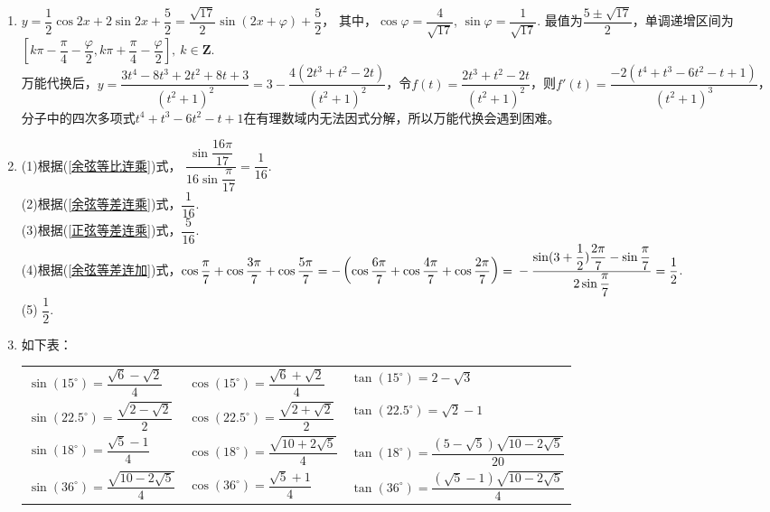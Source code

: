 \begin{enumerate}[label={\textbf{\arabic*.}},leftmargin=
    \inteval{\myenumleftmargin}pt]
\item
$ y=\dfrac{1}{2}\cos 2x+2\sin2x+\dfrac{5}{2}=
\dfrac{\sqrt{17}}{2}\sin(2x+\varphi)+\dfrac{5}{2} $，
其中，$ \cos\varphi=\dfrac{4}{\sqrt{17}} $, $ \sin\varphi=\dfrac{1}{\sqrt{17}} $. 
最值为$ \dfrac{5\pm \sqrt{17}}{2} $，单调递增区间为$ [k\pi-\dfrac{\pi}{4}-\dfrac{\varphi}{2},k\pi+\dfrac{\pi}{4}-\dfrac{\varphi}{2}],\ k\in \textbf{Z} $. \\
万能代换后，$ y=\dfrac{3t^4-8t^3+2t^2+8t+3}{(t^2+1)^2}=3-\dfrac{4(2t^3+t^2-2t)}
{(t^2+1)^2} $，令$ f(t)=\dfrac{2t^3+t^2-2t}{(t^2+1)^2} $，则$ f'(t)=
\dfrac{-2(t^4+t^3-6t^2-t+1)}{(t^2+1)^3} $，分子中的四次多项式$ t^4+t^3-6t^2-t+1 $在有理数域内无法因式分解，所以万能代换会遇到困难。

\item
(1)根据(\ref{余弦等比连乘})式，
$ \dfrac{\sin\dfrac{16\pi}{17}}{16\sin\dfrac{\pi}{17}}=\dfrac{1}{16} $. \\
(2)根据(\ref{余弦等差连乘})式，$ \dfrac{1}{16} $. \\
(3)根据(\ref{正弦等差连乘})式，$ \dfrac{5}{16} $. \\
(4)根据(\ref{余弦等差连加})式，$ \cos\dfrac{\pi}{7}+\cos\dfrac{3\pi}{7}+\cos\dfrac{5\pi}{7}=
-\left(\cos\dfrac{6\pi}{7}+\cos\dfrac{4\pi}{7}+\cos\dfrac{2\pi}{7}\right)= \\
-\dfrac{\sin(3+\dfrac{1}{2})\dfrac{2\pi}{7}-\sin\dfrac{\pi}{7}}{2\sin\dfrac{\pi}{7}}=\dfrac{1}{2} $. \\
(5) $ \dfrac{1}{2} $. 

\item 如下表：
\begin{table}[h]
    \centering
    \begin{tabular}{l|l|l}
        $ \sin(15^{\circ})=\dfrac{\sqrt{6}-\sqrt{2}}{4} $ & 
        $ \cos(15^{\circ})=\dfrac{\sqrt{6}+\sqrt{2}}{4} $ & 
        $ \tan(15^{\circ})=2-\sqrt{3}$ \\ [9pt]
        $ \sin(22.5^{\circ})=\dfrac{\sqrt{2-\sqrt{2}}}{2} $ & 
        $\cos(22.5^{\circ})=\dfrac{\sqrt{2+\sqrt{2}}}{2}$ & 
        $ \tan(22.5^{\circ})=\sqrt{2}-1 $ \\ 
        [9pt]		
        $ \sin(18^{\circ})=\dfrac{\sqrt{5}-1}{4} $ & 
        $\cos(18^{\circ})=\dfrac{\sqrt{10+2\sqrt{5}}}{4} $ &
        $ \tan(18^{\circ})=\dfrac{\left(5-\sqrt{5}\right)
            \sqrt{10-2\sqrt{5}}}{20} $ \\ [9pt]	
        $ \sin(36^{\circ})=\dfrac{\sqrt{10-2\sqrt{5}}}{4} $ & $\cos(36^{\circ})=\dfrac{\sqrt{5}+1}{4} $ &
        $ \tan(36^{\circ})=\dfrac{\left(\sqrt{5}-1\right)
            \sqrt{10-2\sqrt{5}}}{4} $ \\ [9pt]
    \end{tabular} 
\end{table}


\end{enumerate}
